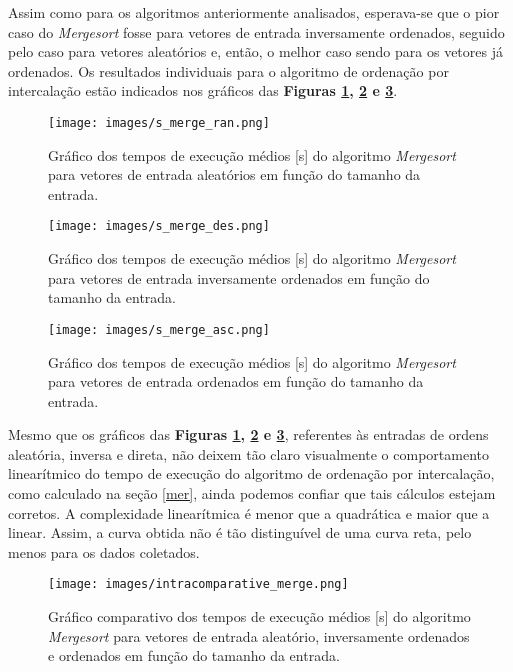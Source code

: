 \documentclass[fontsize=10pt]{article}
\begin{document}
Assim como para os algoritmos anteriormente analisados, esperava-se que o pior caso do \textit{Mergesort} fosse para vetores de entrada inversamente ordenados, seguido pelo caso para vetores aleatórios e, então, o melhor caso sendo para os vetores já ordenados. Os resultados individuais para o algoritmo de ordenação por intercalação estão indicados nos gráficos das \textbf{Figuras \ref{s-mer-ran}, \ref{s-mer-des} e \ref{s-mer-asc}}.

\begin{figure}[H]
\centering
\texttt{[image: images/s\_merge\_ran.png]}
\caption{Gráfico dos tempos de execução médios [s] do algoritmo \textit{Mergesort} para vetores de entrada aleatórios em função do tamanho da entrada.}
\label{s-mer-ran}
\end{figure}

\begin{figure}[H]
\centering
\texttt{[image: images/s\_merge\_des.png]}
\caption{Gráfico dos tempos de execução médios [s] do algoritmo \textit{Mergesort} para vetores de entrada inversamente ordenados em função do tamanho da entrada.}
\label{s-mer-des}
\end{figure}

\begin{figure}[H]
\centering
\texttt{[image: images/s\_merge\_asc.png]}
\caption{Gráfico dos tempos de execução médios [s] do algoritmo \textit{Mergesort} para vetores de entrada ordenados em função do tamanho da entrada.}
\label{s-mer-asc}
\end{figure}

Mesmo que os gráficos das \textbf{Figuras \ref{s-mer-ran}, \ref{s-mer-des} e \ref{s-mer-asc}}, referentes às entradas de ordens aleatória, inversa e direta, não deixem tão claro visualmente o comportamento linearítmico do tempo de execução do algoritmo de ordenação por intercalação, como calculado na seção \ref{mer}, ainda podemos confiar que tais cálculos estejam corretos. A complexidade linearítmica é menor que a quadrática e maior que a linear. Assim, a curva obtida não é tão distinguível de uma curva reta, pelo menos para os dados coletados. 

\begin{figure}[H]
\centering
\texttt{[image: images/intracomparative\_merge.png]}
\caption{Gráfico comparativo dos tempos de execução médios [s] do algoritmo \textit{Mergesort} para vetores de entrada aleatório, inversamente ordenados e ordenados em função do tamanho da entrada.}
\label{intracomp-mer}
\end{figure}
\end{document}
